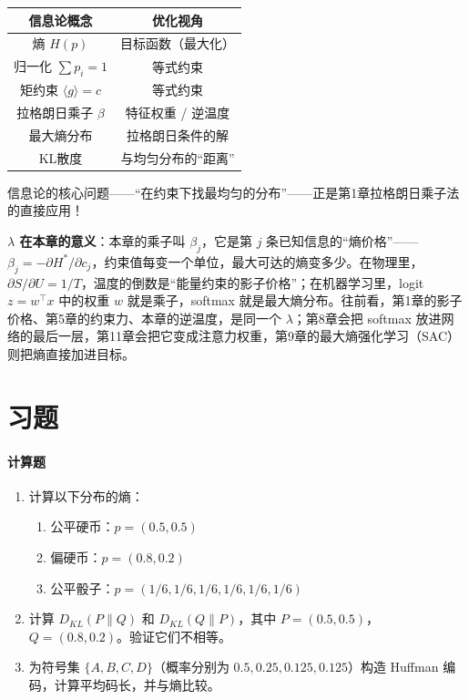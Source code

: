 \begin{unification}[title=本章的统一视角]
\begin{center}
\begin{tabular}{c|c}
\toprule
\textbf{信息论概念} & \textbf{优化视角} \\
\midrule
熵 $H(p)$ & 目标函数（最大化） \\
归一化 $\sum p_i = 1$ & 等式约束 \\
矩约束 $\langle g \rangle = c$ & 等式约束 \\
拉格朗日乘子 $\beta$ & 特征权重 / 逆温度 \\
最大熵分布 & 拉格朗日条件的解 \\
KL散度 & 与均匀分布的“距离” \\
\bottomrule
\end{tabular}
\end{center}

信息论的核心问题——“在约束下找最均匀的分布”——正是第1章拉格朗日乘子法的直接应用！
\end{unification}

\begin{physicalmeaning}
\textbf{$\lambda$ 在本章的意义}：本章的乘子叫 $\beta_j$，它是第 $j$ 条已知信息的“熵价格”——$\beta_j = -\partial H^*/\partial c_j$，约束值每变一个单位，最大可达的熵变多少。在物理里，$\partial S/\partial U = 1/T$，温度的倒数是“能量约束的影子价格”；在机器学习里，logit $z = w^\top x$ 中的权重 $w$ 就是乘子，softmax 就是最大熵分布。往前看，第1章的影子价格、第5章的约束力、本章的逆温度，是同一个 $\lambda$；第8章会把 softmax 放进网络的最后一层，第11章会把它变成注意力权重，第9章的最大熵强化学习（SAC）则把熵直接加进目标。
\end{physicalmeaning}

\section{习题}

\paragraph{计算题}
\begin{enumerate}
    \item 计算以下分布的熵：
    \begin{enumerate}
        \item 公平硬币：$p = (0.5, 0.5)$
        \item 偏硬币：$p = (0.8, 0.2)$
        \item 公平骰子：$p = (1/6, 1/6, 1/6, 1/6, 1/6, 1/6)$
    \end{enumerate}
    
    \item 计算 $D_{KL}(P \| Q)$ 和 $D_{KL}(Q \| P)$，其中 $P = (0.5, 0.5)$，$Q = (0.8, 0.2)$。验证它们不相等。
    
    \item 为符号集 $\{A, B, C, D\}$（概率分别为 $0.5, 0.25, 0.125, 0.125$）构造 Huffman 编码，计算平均码长，并与熵比较。
\end{enumerate}

